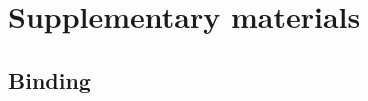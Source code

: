 \documentclass{article}
\begin{document}
\appendix
\section{Supplementary materials}

\subsection{Binding}


\end{document}
